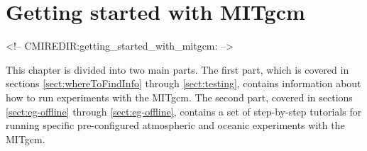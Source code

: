 
\chapter[Getting Started with MITgcm]{Getting started with MITgcm}
\label{chap:getting_started}

\begin{rawhtml}
<!-- CMIREDIR:getting_started_with_mitgcm: -->
\end{rawhtml}

This chapter is divided into two main parts. The first part, which is covered in sections 
\ref{sect:whereToFindInfo} through \ref{sect:testing}, contains information about how to run
experiments with the MITgcm. The second part, covered in sections \ref{sect:eg-offline} through
\ref{sect:eg-offline}, contains a set of step-by-step tutorials for running specific pre-configured 
atmospheric and oceanic experiments with the MITgcm.



\newpage


\newpage


\newpage


